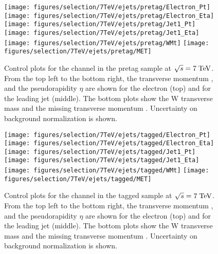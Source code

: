 \begin{figure}
  \centering
  \texttt{[image: figures/selection/7TeV/ejets/pretag/Electron\_Pt]}
  \texttt{[image: figures/selection/7TeV/ejets/pretag/Electron\_Eta]}
  \texttt{[image: figures/selection/7TeV/ejets/pretag/Jet1\_Pt]}
  \texttt{[image: figures/selection/7TeV/ejets/pretag/Jet1\_Eta]}
  \texttt{[image: figures/selection/7TeV/ejets/pretag/WMt]}
  \texttt{[image: figures/selection/7TeV/ejets/pretag/MET]}
  \caption[Control plots for the \ejets{} channel in the pretag
    sample at $\sqrt{s} = 7 \TeV{}$]{Control plots for the \ejets{} channel in the pretag
    sample at $\sqrt{s} = 7 \TeV{}$.  From the top left to the bottom right, the transverse
    momentum \pt{}, and the pseudorapidity $\eta$ are shown for the
    electron (top) and for the leading jet (middle). The bottom plots
    show the W transverse mass \mtw{} and the missing transverse
    momentum \met{}. Uncertainty on background normalization is shown.}
  \label{fig:2011ele_pretag}
\end{figure}
%                                      
\begin{figure}
\centering
\texttt{[image: figures/selection/7TeV/ejets/tagged/Electron\_Pt]}
\texttt{[image: figures/selection/7TeV/ejets/tagged/Electron\_Eta]}
\texttt{[image: figures/selection/7TeV/ejets/tagged/Jet1\_Pt]}
\texttt{[image: figures/selection/7TeV/ejets/tagged/Jet1\_Eta]}
\texttt{[image: figures/selection/7TeV/ejets/tagged/WMt]}
\texttt{[image: figures/selection/7TeV/ejets/tagged/MET]}
\caption[Control plots for the \ejets{} channel in the tagged
  sample at $\sqrt{s} = 7 \TeV{}$]{Control plots for the \ejets{} channel in the tagged
  sample at $\sqrt{s} = 7 \TeV{}$.  From the top left to the bottom right, the transverse
  momentum \pt{}, and the pseudorapidity $\eta$ are shown for the
  electron (top) and for the leading jet (middle). The bottom plots
  show the W transverse mass \mtw{} and the missing transverse
  momentum \met{}. Uncertainty on background normalization is shown.}
\label{fig:2011ele_tagged}
\end{figure}


